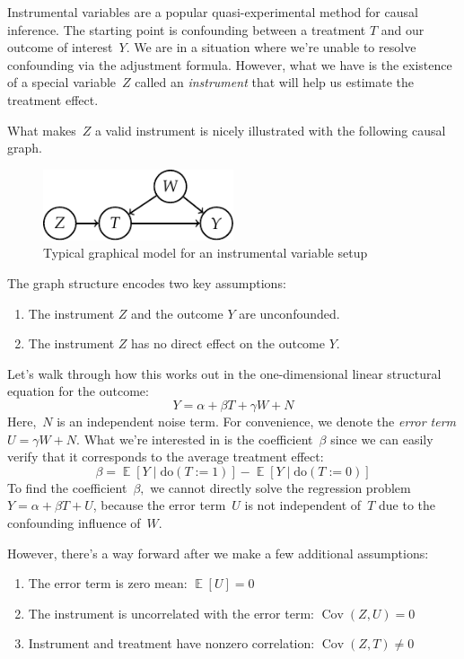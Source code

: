 \documentclass{tufte-book}
\begin{document}
Instrumental variables are a popular quasi-experimental method for
causal inference. The starting point is confounding between a treatment
\(T\) and our outcome of interest~\(Y\). We are in a situation where
we're unable to resolve confounding via the adjustment formula. However,
what we have is the existence of a special variable~\(Z\) called an
\emph{instrument} that will help us estimate the treatment effect.

What makes~\(Z\) a valid instrument is nicely illustrated with the
following causal graph.

\begin{figure}
\centering
\includegraphics[width=0.5\textwidth,height=\textheight]{assets/causal-iv}
\caption{Typical graphical model for an instrumental variable setup}
\end{figure}

The graph structure encodes two key assumptions:

\begin{enumerate}
\def\labelenumi{\arabic{enumi}.}
\tightlist
\item
  The instrument \(Z\) and the outcome \(Y\) are unconfounded.
\item
  The instrument \(Z\) has no direct effect on the outcome \(Y\).
\end{enumerate}

Let's walk through how this works out in the one-dimensional linear
structural equation for the outcome: \[
Y= \alpha + \beta T + \gamma W + N
\] Here,~\(N\) is an independent noise term. For convenience, we denote
the \emph{error term} \(U=\gamma W + N\). What we're interested in is
the coefficient~\(\beta\) since we can easily verify that it corresponds
to the average treatment effect: \[
\beta = \mathop\mathbb{E}[Y\mid\mathrm{do}(T:=1)] - \mathop\mathbb{E}[Y\mid\mathrm{do}(T:=0)]
\] To find the coefficient~\(\beta,\) we cannot directly solve the
regression problem~\(Y=\alpha + \beta T + U\), because the error
term~\(U\) is not independent of~\(T\) due to the confounding influence
of~\(W\).

However, there's a way forward after we make a few additional
assumptions:

\begin{enumerate}
\def\labelenumi{\arabic{enumi}.}
\tightlist
\item
  The error term is zero mean: \(\mathop\mathbb{E}[U]=0\)
\item
  The instrument is uncorrelated with the error term:
  \(\mathop\mathrm{Cov}(Z, U)=0\)
\item
  Instrument and treatment have nonzero correlation:
  \(\mathop\mathrm{Cov}(Z, T)\ne 0\)
\end{enumerate}
\end{document}

